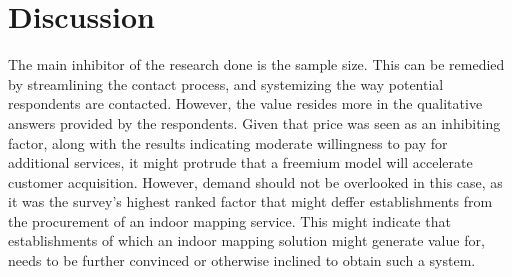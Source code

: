 \section{Discussion}
The main inhibitor of the research done is the sample size. This can be remedied by streamlining the contact process, and systemizing the way potential respondents are contacted. However, the value resides more in the qualitative answers provided by the respondents. Given that price was seen as an inhibiting factor, along with the results indicating moderate willingness to pay for additional services, it might protrude that a freemium model will accelerate customer acquisition. However, demand should not be overlooked in this case, as it was the survey's highest ranked factor that might deffer establishments from the procurement of an indoor mapping service. This might indicate that establishments of which an indoor mapping solution might generate value for, needs to be further convinced or otherwise inclined to obtain such a system.
